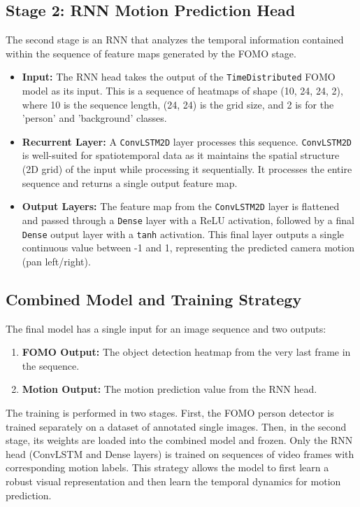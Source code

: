 \documentclass{article}
\begin{document}
\subsection{Stage 2: RNN Motion Prediction Head}
The second stage is an RNN that analyzes the temporal information contained within the sequence of feature maps generated by the FOMO stage.
\begin{itemize}
    \item \textbf{Input:} The RNN head takes the output of the \texttt{TimeDistributed} FOMO model as its input. This is a sequence of heatmaps of shape (10, 24, 24, 2), where 10 is the sequence length, (24, 24) is the grid size, and 2 is for the 'person' and 'background' classes.
    \item \textbf{Recurrent Layer:} A \texttt{ConvLSTM2D} layer processes this sequence. \texttt{ConvLSTM2D} is well-suited for spatiotemporal data as it maintains the spatial structure (2D grid) of the input while processing it sequentially. It processes the entire sequence and returns a single output feature map.
    \item \textbf{Output Layers:} The feature map from the \texttt{ConvLSTM2D} layer is flattened and passed through a \texttt{Dense} layer with a ReLU activation, followed by a final \texttt{Dense} output layer with a \texttt{tanh} activation. This final layer outputs a single continuous value between -1 and 1, representing the predicted camera motion (pan left/right).
\end{itemize}

\subsection{Combined Model and Training Strategy}
The final model has a single input for an image sequence and two outputs:
\begin{enumerate}
    \item \textbf{FOMO Output:} The object detection heatmap from the very last frame in the sequence.
    \item \textbf{Motion Output:} The motion prediction value from the RNN head.
\end{enumerate}
The training is performed in two stages. First, the FOMO person detector is trained separately on a dataset of annotated single images. Then, in the second stage, its weights are loaded into the combined model and frozen. Only the RNN head (ConvLSTM and Dense layers) is trained on sequences of video frames with corresponding motion labels. This strategy allows the model to first learn a robust visual representation and then learn the temporal dynamics for motion prediction.
\end{document}
